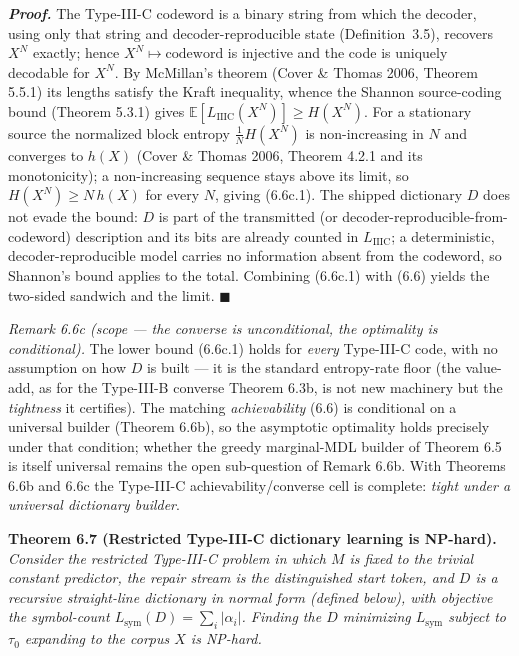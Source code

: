 \documentclass[
]{article}
\begin{document}
\emph{\textbf{Proof.}} The Type-III-C codeword is a binary string from
which the decoder, using only that string and decoder-reproducible
state (Definition~3.5), recovers $X^N$ exactly; hence $X^N \mapsto
\text{codeword}$ is injective and the code is uniquely decodable for
$X^N$. By McMillan's theorem (Cover \& Thomas 2006, Theorem 5.5.1) its
lengths satisfy the Kraft inequality, whence the Shannon source-coding
bound (Theorem 5.3.1) gives $\mathbb{E}[L_{\mathrm{IIIC}}(X^N)] \ge
H(X^N)$. For a stationary source the normalized block entropy
$\tfrac{1}{N}H(X^N)$ is non-increasing in $N$ and converges to $h(X)$
(Cover \& Thomas 2006, Theorem 4.2.1 and its monotonicity); a
non-increasing sequence stays above its limit, so $H(X^N) \ge N\,h(X)$
for every $N$, giving (6.6c.1). The shipped dictionary $D$ does not
evade the bound: $D$ is part of the transmitted (or
decoder-reproducible-from-codeword) description and its bits are
already counted in $L_{\mathrm{IIIC}}$; a deterministic,
decoder-reproducible model carries no information absent from the
codeword, so Shannon's bound applies to the total. Combining (6.6c.1)
with (6.6) yields the two-sided sandwich and the limit. \hfill$\blacksquare$

\emph{Remark 6.6c (scope --- the converse is unconditional, the
optimality is conditional).} The lower bound (6.6c.1) holds for
\emph{every} Type-III-C code, with no assumption on how $D$ is built ---
it is the standard entropy-rate floor (the value-add, as for the
Type-III-B converse Theorem 6.3b, is not new machinery but the
\emph{tightness} it certifies). The matching \emph{achievability}
(6.6) is conditional on a universal builder (Theorem 6.6b), so the
asymptotic optimality holds precisely under that condition; whether the
greedy marginal-MDL builder of Theorem 6.5 is itself universal remains
the open sub-question of Remark 6.6b. With Theorems 6.6b and 6.6c the
Type-III-C achievability/converse cell is complete: \emph{tight under a
universal dictionary builder}.

\textbf{Theorem 6.7 (Restricted Type-III-C dictionary learning is
NP-hard).} \emph{Consider the restricted Type-III-C problem in which
$M$ is fixed to the trivial constant predictor, the repair stream is
the distinguished start token, and $D$ is a recursive straight-line
dictionary in normal form (defined below), with objective the
symbol-count $L_{\mathrm{sym}}(D) = \sum_i |\alpha_i|$. Finding the
$D$ minimizing $L_{\mathrm{sym}}$ subject to $\tau_0$ expanding to
the corpus $X$ is NP-hard.}
\end{document}
